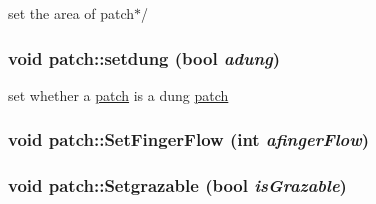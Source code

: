 set the area of patch$\ast$/ \hypertarget{classpatch_a64bb8ae35378455255ca5a1b546d70d1}{
\subsubsection[{setdung}]{\setlength{\rightskip}{0pt plus 5cm}void patch::setdung (bool {\em adung})}}
\label{classpatch_a64bb8ae35378455255ca5a1b546d70d1}


set whether a \hyperlink{classpatch}{patch} is a dung \hyperlink{classpatch}{patch} \hypertarget{classpatch_a79adbf0a0c1fee340accf581487d8f54}{
\subsubsection[{SetFingerFlow}]{\setlength{\rightskip}{0pt plus 5cm}void patch::SetFingerFlow (int {\em afingerFlow})}}
\label{classpatch_a79adbf0a0c1fee340accf581487d8f54}
\hypertarget{classpatch_a6e95e7ea2fbab3b4dac4747ad2331648}{
\subsubsection[{Setgrazable}]{\setlength{\rightskip}{0pt plus 5cm}void patch::Setgrazable (bool {\em isGrazable})}}
\label{classpatch_a6e95e7ea2fbab3b4dac4747ad2331648}


